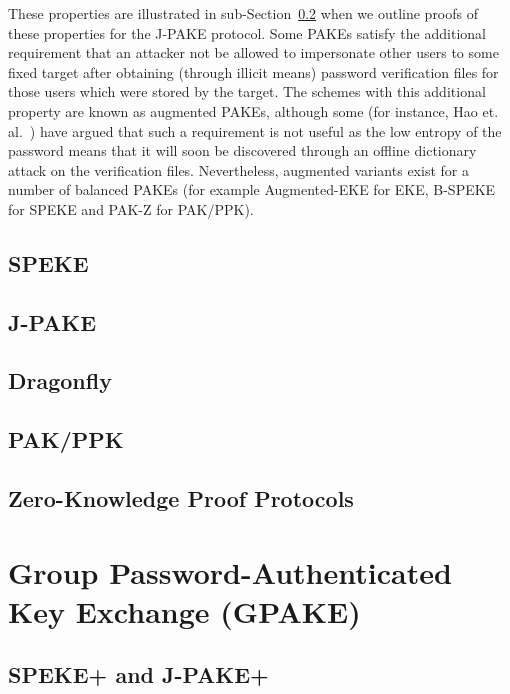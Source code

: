 \documentclass{amsart}
\theoremstyle{remark}
\begin{document}
 These properties are illustrated in sub-Section~\ref{sec:JPAKE} when we outline proofs of these properties
 for the J-PAKE protocol. Some PAKEs satisfy the additional requirement that an attacker not be 
 allowed to impersonate other users to some fixed target after obtaining (through illicit means) password 
 verification files for those users which were stored by the target.  The schemes with this additional property 
 are known as augmented PAKEs, although some (for instance, Hao et. al.~\cite{HaYiChSh15}) have argued that 
 such a requirement is not useful as the low entropy of the password means that it will soon be discovered 
 through an offline dictionary attack on the verification files.  Nevertheless, augmented variants exist for a number
of balanced PAKEs (for example Augmented-EKE for EKE, B-SPEKE for SPEKE and PAK-Z for PAK/PPK). 

\subsection{SPEKE}


\subsection{J-PAKE} 
\label{sec:JPAKE}


\subsection{Dragonfly}
\label{sec:Dragon}


\subsection{PAK/PPK}
\label{sec:PPK}


\subsection{Zero-Knowledge Proof Protocols}
\label{sec:ZKP}



\section{Group Password-Authenticated Key Exchange (GPAKE)} 
\label{sec:GPAKE}


\subsection{SPEKE+ and J-PAKE+}

\end{document}
